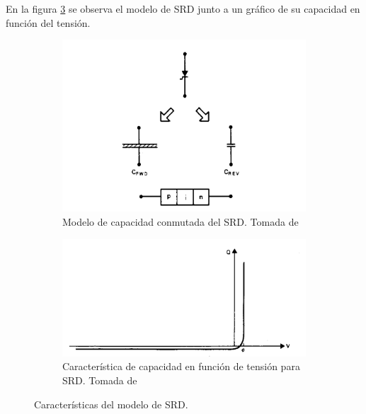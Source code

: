 En la figura \ref{fig:srd_model_characteristics} se observa el modelo de SRD
junto a un gráfico de su capacidad en función del tensión.

\begin{figure}
    \centering
    \begin{subfigure}[b]{0.45\textwidth}
        \includegraphics[width=\textwidth]{images/srd_switched_model.jpg}
        \caption{Modelo de capacidad conmutada del SRD. Tomada de
        \cite{moll1969}}
        \label{fig:srd_switched_model}
    \end{subfigure}
    \hfill
    \begin{subfigure}[b]{0.45\textwidth}
        \includegraphics[width=\textwidth]{images/srd_capacity_vs_voltaje.jpg}
        \caption{Característica de capacidad en función de tensión para SRD.
        Tomada de \cite{moll1969}}
        \label{fig:srd_capacity_vs_voltaje}
    \end{subfigure}
    \caption{Características del modelo de SRD.}
    \label{fig:srd_model_characteristics}
\end{figure}

